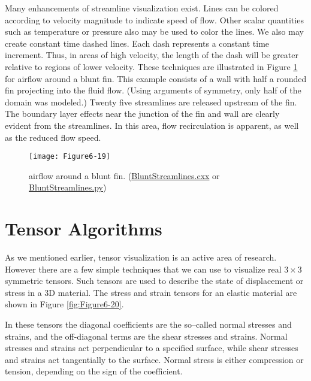 Many enhancements of streamline visualization exist. Lines can be colored according to velocity magnitude to indicate speed of flow. Other scalar quantities such as temperature or pressure also may be used to color the lines. We also may create constant time dashed lines. Each dash represents a constant time increment. Thus, in areas of high velocity, the length of the dash will be greater relative to regions of lower velocity. These techniques are illustrated in Figure \ref{fig:Figure6-19} for airflow around a blunt fin. This example consists of a wall with half a rounded fin projecting into the fluid flow. (Using arguments of symmetry, only half of the domain was modeled.) Twenty five streamlines are released upstream of the fin. The boundary layer effects near the junction of the fin and wall are clearly evident from the streamlines. In this area, flow recirculation is apparent, as well as the reduced flow speed.

\begin{figure}[htb]
	\texttt{[image: Figure6-19]}
	\caption{airflow around a blunt fin. (\href{https://lorensen.github.io/VTKExamples/site/Cxx/VisualizationAlgorithms/BluntStreamlines}{BluntStreamlines.cxx} or \href{https://lorensen.github.io/VTKExamples/site/Python/VisualizationAlgorithms/BluntStreamlines/}{BluntStreamlines.py})}\label{fig:Figure6-19}
\end{figure}

\section{Tensor Algorithms}

As we mentioned earlier, tensor visualization is an active area of research. However there are a few simple techniques that we can use to visualize real $3 \times 3$ symmetric tensors. Such tensors are used to describe the state of displacement or stress in a 3D material. The stress and strain tensors for an elastic material are shown in Figure \ref{fig:Figure6-20}.

In these tensors the diagonal coefficients are the so--called normal stresses and strains, and the off-diagonal terms are the shear stresses and strains. Normal stresses and strains act perpendicular to a specified surface, while shear stresses and strains act tangentially to the surface. Normal stress is either compression or tension, depending on the sign of the coefficient.

